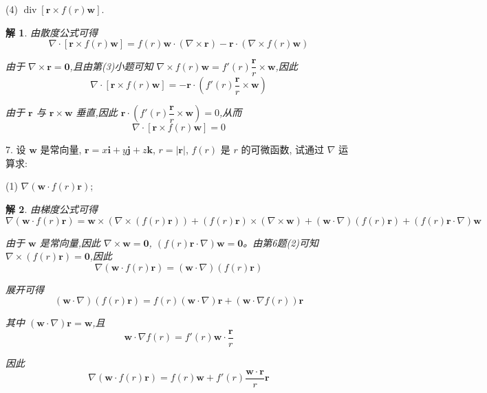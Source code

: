 \documentclass[a4paper,12pt]{article}
\newtheorem*{sol}{解}
\begin{document}
(4) $\operatorname{div}\left[\boldsymbol{r} \times f(r)\boldsymbol{w}\right]$.
\begin{sol}
    由散度公式可得
    $$\nabla\cdot[\boldsymbol{r} \times f(r)\boldsymbol{w}]=f(r)\boldsymbol{w}\cdot(\nabla\times\boldsymbol{r})-\boldsymbol{r}\cdot(\nabla\times f(r)\boldsymbol{w})$$

    由于 $\nabla\times\boldsymbol{r}=\boldsymbol{0}$,且由第(3)小题可知 $\nabla\times f(r)\boldsymbol{w}=f'(r)\dfrac{\boldsymbol{r}}{r}\times\boldsymbol{w}$,因此
    $$\nabla\cdot[\boldsymbol{r} \times f(r)\boldsymbol{w}]=-\boldsymbol{r}\cdot\left(f'(r)\dfrac{\boldsymbol{r}}{r}\times\boldsymbol{w}\right)$$

    由于 $\boldsymbol{r}$ 与 $\boldsymbol{r}\times\boldsymbol{w}$ 垂直,因此 $\boldsymbol{r}\cdot\left(f'(r)\dfrac{\boldsymbol{r}}{r}\times\boldsymbol{w}\right)=0$,从而
    $$\nabla\cdot[\boldsymbol{r} \times f(r)\boldsymbol{w}]=0$$
\end{sol}


7. 设 $\boldsymbol{w}$ 是常向量, $\boldsymbol{r} = x\boldsymbol{i} + y\boldsymbol{j} + z\boldsymbol{k}$, $r = |\boldsymbol{r}|$, $f(r)$ 是 $r$ 的可微函数, 试通过 $\nabla$ 运算求:

(1) $\nabla\left(\boldsymbol{w} \cdot f(r)\boldsymbol{r}\right)$;
\begin{sol}
    由梯度公式可得
    $$\nabla(\boldsymbol{w}\cdot f(r)\boldsymbol{r})=\boldsymbol{w}\times(\nabla\times(f(r)\boldsymbol{r}))+(f(r)\boldsymbol{r})\times(\nabla\times\boldsymbol{w})+(\boldsymbol{w}\cdot\nabla)(f(r)\boldsymbol{r})+(f(r)\boldsymbol{r}\cdot\nabla)\boldsymbol{w}$$

    由于 $\boldsymbol{w}$ 是常向量,因此 $\nabla\times\boldsymbol{w}=\boldsymbol{0}$, $(f(r)\boldsymbol{r}\cdot\nabla)\boldsymbol{w}=\boldsymbol{0}$。由第6题(2)可知 $\nabla\times(f(r)\boldsymbol{r})=\boldsymbol{0}$,因此
    $$\nabla(\boldsymbol{w}\cdot f(r)\boldsymbol{r})=(\boldsymbol{w}\cdot\nabla)(f(r)\boldsymbol{r})$$

    展开可得
    $$(\boldsymbol{w}\cdot\nabla)(f(r)\boldsymbol{r})=f(r)(\boldsymbol{w}\cdot\nabla)\boldsymbol{r}+(\boldsymbol{w}\cdot\nabla f(r))\boldsymbol{r}$$

    其中 $(\boldsymbol{w}\cdot\nabla)\boldsymbol{r}=\boldsymbol{w}$,且
    $$\boldsymbol{w}\cdot\nabla f(r)=f'(r)\boldsymbol{w}\cdot\dfrac{\boldsymbol{r}}{r}$$

    因此
    $$\nabla(\boldsymbol{w}\cdot f(r)\boldsymbol{r})=f(r)\boldsymbol{w}+f'(r)\dfrac{\boldsymbol{w}\cdot\boldsymbol{r}}{r}\boldsymbol{r}$$
\end{sol}
\end{document}
